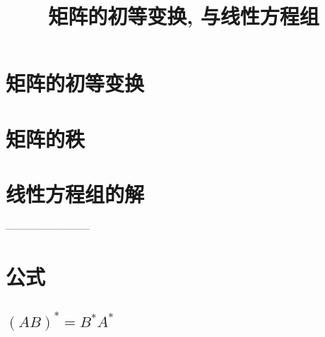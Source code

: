 \documentclass[UTF8]{ctexart}
\title{矩阵的初等变换, 与线性方程组}
\begin{document}
	\tableofcontents %
	\date{} %
	\maketitle  %
	
	
	\section{矩阵的初等变换}
	
	\section{矩阵的秩}
	
	\section{线性方程组的解}
	
	
	
	
	--------------------------
	
	\section{公式}
	
		\subsection{$\left( AB \right) ^*=B^*A^*	$}
	
	
	
	
	
	
\end{document}
